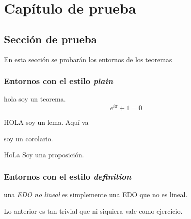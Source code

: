 \chapter{Capítulo de prueba}
\lipsum[1-2]
\lipsum[3]

\section{Sección de prueba}

En esta sección se probarán los entornos de los teoremas
\subsection{Entornos con el estilo \textit{plain}}

\begin{theorem}
hola soy un teorema.
\begin{equation}
    e^{i\pi} + 1 = 0
\end{equation}
\end{theorem}

\begin{lemma}
HOLA soy un lema. Aquí va 
\end{lemma}

\begin{corollary}
soy un corolario.
\end{corollary}

\begin{proposition}
HoLa Soy una proposición.
\end{proposition}


\subsection{Entornos con el estilo \textit{definition}}

\begin{definition}
una \textit{EDO no lineal} es simplemente una EDO que no es lineal.
\end{definition}

\begin{exercise}[Ejercicio]
Lo anterior es tan trivial que ni siquiera vale como ejercicio.
\end{exercise}

